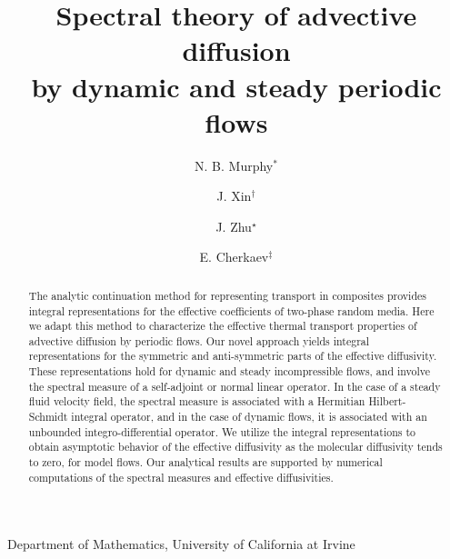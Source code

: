 \documentclass[11pt]{amsart}
\begin{document}
\title{Spectral theory of advective diffusion \\
  by dynamic and steady periodic flows}


\author{N. B. Murphy$^\ast$}
\address{$^*$Department of Mathematics, 340 Rowland Hall, University of
  California at Irvine, Irvine, CA 92697-3875, USA}

\author{J. Xin$^\dag$}
\address{$^{\dag}$Department of Mathematics, 340 Rowland Hall, University of
  California at Irvine, Irvine, CA 92697-3875, USA} 

\author{J. Zhu$^\star$}
\address{$^\star$University of Utah, Department of Mathematics, 155 S 1400 E
  RM 233, Salt Lake City, UT 84112-009, USA}

\author{E. Cherkaev$^\ddagger$}
\address{$^\ddagger$University of Utah, Department of Mathematics, 155 S 1400 E
  RM 233, Salt Lake City, UT 84112-009, USA} 

\maketitle
\vspace{-3ex}
\begin{center}
  Department of Mathematics, University of California at Irvine
\end{center}



\begin{abstract}
%
The analytic continuation method for representing transport in
composites provides integral representations for the
effective coefficients of two-phase random media. Here we adapt this 
method to characterize the effective thermal transport properties of
advective diffusion by periodic flows. Our novel approach yields
integral representations for the symmetric and 
anti-symmetric parts of the effective diffusivity. These
representations hold for dynamic and steady incompressible flows, and
involve the spectral measure of a self-adjoint or normal linear
operator. In the case of a steady fluid velocity field, the spectral
measure is associated with a Hermitian Hilbert-Schmidt integral
operator, and in the case of dynamic flows, it is associated with an
unbounded integro-differential operator. We utilize the integral
representations to obtain asymptotic behavior of the effective
diffusivity as the molecular diffusivity tends to zero, for model
flows. Our analytical results are supported by numerical computations
of the spectral measures and effective diffusivities.     
%
\end{abstract}
\end{document}
